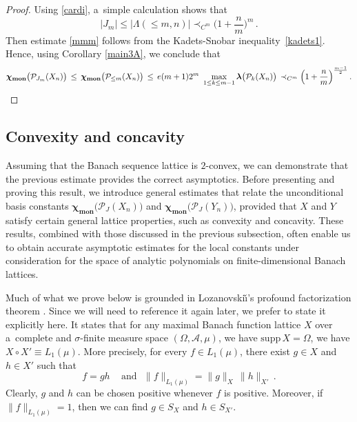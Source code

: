 \documentclass[12pt]{amsart}
\numberwithin{subsection}{section}
\theoremstyle{definition}
\theoremstyle{remark}
\DeclareMathOperator{\mon}{mon}
\newcommand{\chimon}{\chi_{\mon}}
\begin{document}
\begin{proof}
Using \eqref{cardi}, a~simple calculation shows that
\begin{equation*}
|J_m|\le |\Lambda(\leq m,n) | \prec_{C^m} \Big( 1+\frac{n}{m}\Big)^{m}\,.
\end{equation*}
Then estimate \eqref{mmm} follows from the Kadets-Snobar inequality~\eqref{kadets1}. Hence, using Corollary
\ref{main3A}, we conclude that
\[
\boldsymbol{\chimon}\big( \mathcal{P}_{J_m}(X_n)\big)\,\le \,
\boldsymbol{\chimon}\big( \mathcal{P}_{\leq m}(X_n)\big)
\,\le \,e (m+1) 2^m  \,\,\max_{1 \leq  k \leq m-1} \boldsymbol{\lambda}\big( \mathcal{P}_{k}(X_n)\big)\, \prec_{C^m}\Big(1+ \frac{n}{m}\Big)^{\frac{m-1}{2}}\,. \qedhere
\]
\end{proof}


\subsection{Convexity and concavity}

Assuming that the Banach sequence lattice is $2$-convex, we can demonstrate that the previous estimate provides the correct
asymptotics. Before presenting and proving this result, we introduce general estimates that relate the unconditional basis
constants $\boldsymbol{\chimon}\big(\mathcal{P}_{J}(X_n)\big)$ and $\boldsymbol{\chimon}\big(\mathcal{P}_{J}(Y_n)\big)$, provided that $X$
and $Y$ satisfy certain general lattice properties, such as convexity and concavity. These results, combined with those
discussed in the previous subsection, often enable us to obtain accurate asymptotic estimates for the local constants
under consideration for the space of analytic polynomials on finite-dimensional Banach lattices.

Much of what we prove below is grounded in Lozanovski\v{\i}'s profound factorization theorem \cite{Loz}. Since we will need
to reference it again later, we prefer to state it explicitly here. It states that for any maximal Banach function lattice
$X$ over a~complete and $\sigma$-finite measure space $(\Omega, \mathcal{A}, \mu)$, we have $\text{supp}\,X= \Omega$, we
have $X\circ X' \equiv L_1(\mu)$. More precisely, for every $f\in L_1(\mu)$, there exist $g\in X$ and $h\in X'$ such that
\begin{equation*}\label{Lozanovskii}
f= gh \quad\, \text{and} \,\,\,\, \|f\|_{L_1(\mu)} = \|g\|_{X}\,\|h\|_{X'}\,.
\end{equation*}
Clearly, $g$ and $h$ can be chosen positive whenever $f$ is positive. Moreover, if $\|f\|_{L_1(\mu)} =1$,
then we can find $g \in S_{X}$ and $h \in S_{X'}$.
\end{document}
